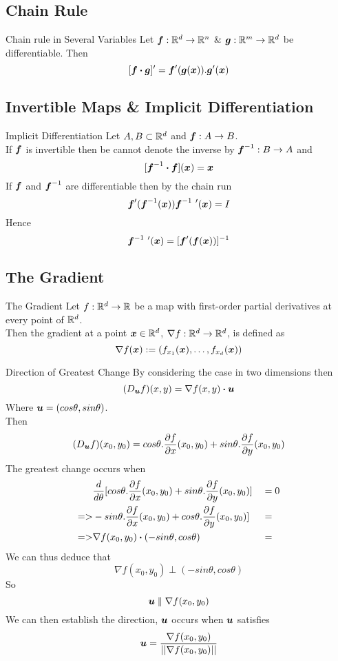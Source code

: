 \documentclass[11pt,a4paper]{article}
\begin{document}
\subsection{Chain Rule}

\subtitle{Theorem 11.1 - }{Chain rule in Several Variables}
Let $\boldsymbol{f} : \mathbb{R}^d \to \mathbb{R}^n$ \& $\boldsymbol{g} : \mathbb{R}^m \to \mathbb{R}^d$ be differentiable. Then
$$[\boldsymbol{f} \boldsymbol{\cdot} \boldsymbol{g}]' = \boldsymbol{f}'(\boldsymbol{g}(\boldsymbol{x})).\boldsymbol{g}'(\boldsymbol{x})$$

\subsection{Invertible Maps \& Implicit Differentiation}

\subtitle{Definition 11.2 - }{Implicit Differentiation}
Let $A, B \subset \mathbb{R}^d$ and $\boldsymbol{f} : A \to B$.\\
If $\boldsymbol{f}$ is invertible then be cannot denote the inverse by $\boldsymbol{f}^{-1} : B \to A$ and $$[\boldsymbol{f}^{-1} \boldsymbol{\cdot} \boldsymbol{f}](\boldsymbol{x}) = \boldsymbol{x}$$
If $\boldsymbol{f}$ and $\boldsymbol{f}^{-1}$ are differentiable then by the chain run $$\boldsymbol{f}' (\boldsymbol{f}^{-1} (\boldsymbol{x})) \boldsymbol{f}^{-1}\ '(\boldsymbol{x}) = I$$
Hence $$\boldsymbol{f}^{-1}\ '(\boldsymbol{x}) = [\boldsymbol{f}'(\boldsymbol{f}(\boldsymbol{x}))]^{-1}$$

\subsection{The Gradient}

\subtitle{Defintion 11.3 - }{The Gradient}
Let $f : \mathbb{R}^d \to \mathbb{R}$ be a map with first-order partial derivatives at every point of $\mathbb{R}^d$.\\
Then the gradient at a point $\boldsymbol{x} \in \mathbb{R}^d$, $\nabla f : \mathbb{R}^d \to \mathbb{R}^d$, is defined as $$\nabla f(\boldsymbol{x}) := (f_{x_1}(\boldsymbol{x}), \dots, f_{x_d}(\boldsymbol{x}))$$

\subtitle{Definition 11.4 - }{Direction of Greatest Change}
By considering the case in two dimensions then $$(D_{\boldsymbol{u}}f)(x,y) = \nabla f(x,y) \boldsymbol{\cdot} \boldsymbol{u}$$
Where $\boldsymbol{u} = (cos\theta, sin\theta)$. \\
Then $$(D_{\boldsymbol{u}}f)(x_0,y_0) = cos\theta.\frac{\partial f}{\partial x}(x_0, y_0) + sin\theta.\frac{\partial f}{\partial y}(x_0, y_0)$$
The greatest change occurs when
\begin{alignat*}{2}
  &\frac{d}{d\theta} [cos\theta.\frac{\partial f}{\partial x}(x_0, y_0) + sin\theta.\frac{\partial f}{\partial y}(x_0, y_0)] &&= 0 \\
  =>&-sin\theta.\frac{\partial f}{\partial x}(x_0, y_0) + cos\theta.\frac{\partial f}{\partial y}(x_0, y_0)] &&= \\
  =>&\nabla f(x_0, y_0) \boldsymbol{\cdot} (-sin\theta, cos\theta) &&= \\
\end{alignat*}
We can thus deduce that $$\nabla f(x_0, y_0) \perp (-sin\theta, cos\theta)$$
So $$\boldsymbol{u} \parallel \nabla f(x_0, y_0)$$
We can then establish the direction, $\boldsymbol{u}$ occurs when $\boldsymbol{u}$ satisfies $$\boldsymbol{u} = \frac{\nabla f(x_0, y_0)}{||\nabla f(x_0, y_0)||}$$
\end{document}

